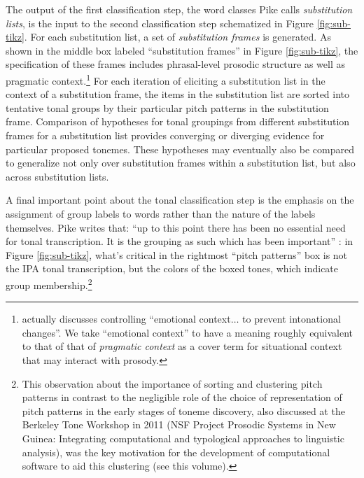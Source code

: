 \documentclass[12pt]{article}
\begin{document}
The output of the first classification step, the word classes Pike
calls \textit{substitution lists}, is the input to the second classification
step schematized in Figure \ref{fig:sub-tikz}. For each substitution list, a set of
\textit{substitution frames} is generated. As shown in the middle box labeled
``substitution frames'' in Figure \ref{fig:sub-tikz}, the
specification of these frames includes phrasal-level prosodic
structure as well as pragmatic context.\footnote{\citet[p.\
  51]{Pike:1948} actually discusses controlling ``emotional
  context$\ldots$ to prevent intonational changes''. We take
  ``emotional context'' to have a meaning
  roughly equivalent to that of that of
  \textit{pragmatic context} as a cover term for situational context
  that may interact with prosody.} For each iteration of eliciting a
substitution list in the context of a substitution frame, the items in the
substitution list are sorted into tentative tonal groups by their particular
pitch patterns in the substitution frame. Comparison of hypotheses for tonal
groupings from different substitution frames for a substitution list
provides converging or diverging evidence for particular proposed
tonemes. These hypotheses may eventually also be compared to
generalize not only over substitution frames within a substitution
list, but also across substitution lists. 

A final important point about
the tonal classification step is the emphasis on the assignment of
group labels to words rather than the nature of the labels
themselves. Pike writes that: ``up to this
point there has been no essential need for tonal transcription. It is
the grouping as such which has been important'' \citep[p.\
55]{Pike:1948}: in Figure \ref{fig:sub-tikz}, what's critical in the
rightmost ``pitch
patterns'' box is not the IPA tonal transcription, but the colors of the
boxed tones, which indicate group membership.\footnote{This
  observation about the importance of sorting and clustering pitch
  patterns in contrast to the negligible role of the choice of
  representation of pitch patterns in the early stages of toneme
  discovery, also discussed at the Berkeley Tone Workshop in 2011 (NSF
  Project Prosodic Systems in New Guinea: Integrating computational and typological approaches to linguistic analysis), was the key motivation for the development of
  computational software to aid this clustering (see this
  volume).} 
\end{document}
